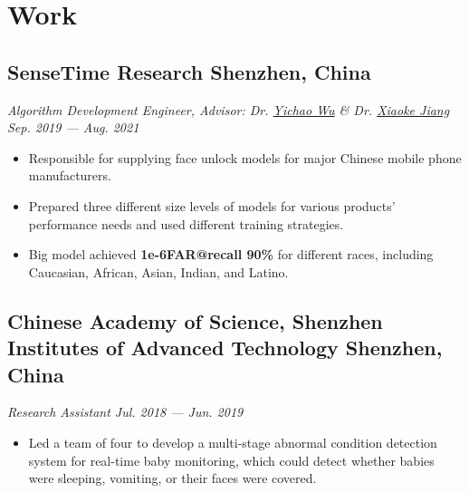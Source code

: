 \documentclass[a4,10pt]{article}
\newcommand{\subtext}[1]{
#1\par\vspace{-0.2cm}}
\newenvironment{zitemize}{
\begin{itemize}\itemsep0pt \parskip0pt \parsep1pt}
{\end{itemize}\vspace{-0.5cm}}
\begin{document}
\section{Work}

\subsection*{SenseTime Research \hfill Shenzhen, China} 
\subtext{\textit{Algorithm Development Engineer, Advisor: Dr. \href{https://scholar.google.com/citations?user=20Its9kAAAAJ&hl=en} {Yichao Wu} \& Dr. \href{https://scholar.google.com/citations?user=aDf9fpkAAAAJ&hl=en} {Xiaoke Jiang}    \hfill Sep. 2019 --- Aug. 2021}}
    \begin{zitemize}
        \item Responsible for supplying face unlock models for major Chinese mobile phone manufacturers.
        \item Prepared three different size levels of models for various products' performance needs and used different training strategies.
        \item Big model achieved \textbf{1e-6FAR@recall 90\%} for different races, including Caucasian, African, Asian, Indian,  and Latino.
    \end{zitemize}

\subsection*{Chinese Academy of Science, Shenzhen Institutes of Advanced Technology \hfill Shenzhen, China} 
\subtext{\textit{Research Assistant
    \hfill Jul. 2018 --- Jun. 2019}}
    \begin{zitemize}
        \item Led a team of four to develop a multi-stage abnormal condition detection system for real-time baby monitoring, which could detect whether babies were sleeping, vomiting, or their faces were covered.
    \end{zitemize}
\end{document}
